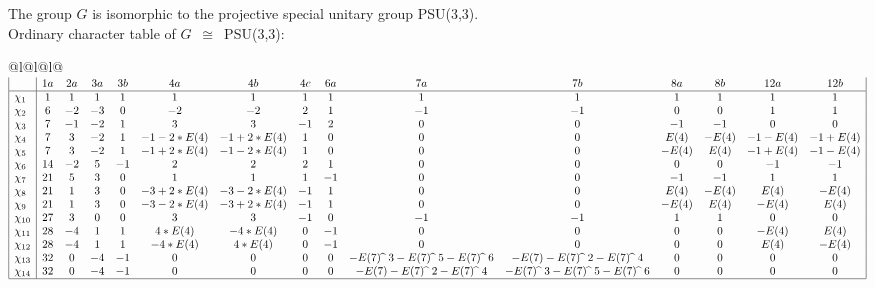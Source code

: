 \documentclass[varwidth=\maxdimen,border=10]{standalone}
\begin{document}
The group $G$ is isomorphic to the projective special unitary group PSU(3,3).\\
Ordinary character table of $G$\ $\cong$\ PSU(3,3):\\
\begin{center}
\begin{tabular}{@{}l@{}l@{}l@{}}
\hline
\(\begin{array}{|l|cccccccccccccc|}
  & 1a & 2a & 3a & 3b & 4a & 4b & 4c & 6a & 7a & 7b & 8a & 8b & 12a & 12b\\ \hline
\chi_{1} & 1 & 1 & 1 & 1 & 1 & 1 & 1 & 1 & 1 & 1 & 1 & 1 & 1 & 1\\
\chi_{2} & 6 & -2 & -3 & 0 & -2 & -2 & 2 & 1 & -1 & -1 & 0 & 0 & 1 & 1\\
\chi_{3} & 7 & -1 & -2 & 1 & 3 & 3 & -1 & 2 & 0 & 0 & -1 & -1 & 0 & 0\\
\chi_{4} & 7 & 3 & -2 & 1 & -1-2*E(4) & -1+2*E(4) & 1 & 0 & 0 & 0 & E(4) & -E(4) & -1-E(4) & -1+E(4)\\
\chi_{5} & 7 & 3 & -2 & 1 & -1+2*E(4) & -1-2*E(4) & 1 & 0 & 0 & 0 & -E(4) & E(4) & -1+E(4) & -1-E(4)\\
\chi_{6} & 14 & -2 & 5 & -1 & 2 & 2 & 2 & 1 & 0 & 0 & 0 & 0 & -1 & -1\\
\chi_{7} & 21 & 5 & 3 & 0 & 1 & 1 & 1 & -1 & 0 & 0 & -1 & -1 & 1 & 1\\
\chi_{8} & 21 & 1 & 3 & 0 & -3+2*E(4) & -3-2*E(4) & -1 & 1 & 0 & 0 & E(4) & -E(4) & E(4) & -E(4)\\
\chi_{9} & 21 & 1 & 3 & 0 & -3-2*E(4) & -3+2*E(4) & -1 & 1 & 0 & 0 & -E(4) & E(4) & -E(4) & E(4)\\
\chi_{10} & 27 & 3 & 0 & 0 & 3 & 3 & -1 & 0 & -1 & -1 & 1 & 1 & 0 & 0\\
\chi_{11} & 28 & -4 & 1 & 1 & 4*E(4) & -4*E(4) & 0 & -1 & 0 & 0 & 0 & 0 & -E(4) & E(4)\\
\chi_{12} & 28 & -4 & 1 & 1 & -4*E(4) & 4*E(4) & 0 & -1 & 0 & 0 & 0 & 0 & E(4) & -E(4)\\
\chi_{13} & 32 & 0 & -4 & -1 & 0 & 0 & 0 & 0 & -E(7) \widehat{\ }\ {3}-E(7) \widehat{\ }\ {5}-E(7) \widehat{\ }\ {6} & -E(7)-E(7) \widehat{\ }\ {2}-E(7) \widehat{\ }\ {4} & 0 & 0 & 0 & 0\\
\chi_{14} & 32 & 0 & -4 & -1 & 0 & 0 & 0 & 0 & -E(7)-E(7) \widehat{\ }\ {2}-E(7) \widehat{\ }\ {4} & -E(7) \widehat{\ }\ {3}-E(7) \widehat{\ }\ {5}-E(7) \widehat{\ }\ {6} & 0 & 0 & 0 & 0\\
\hline
\end{array}\)\\
\end{tabular}
\end{center}
\end{document}
